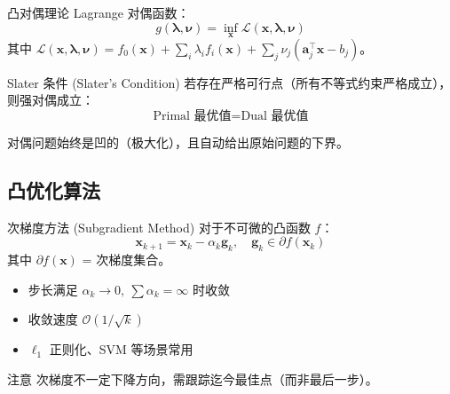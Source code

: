 \documentclass[11pt, aspectratio=169, svgnames, table, fontset=fandol]{ctexbeamer}
\begin{document}
\begin{frame}{凸对偶理论}
  Lagrange 对偶函数：
  \begin{equation*}
    g(\bm{\lambda}, \bm{\nu}) = \inf_{\bm{x}} \mathcal{L}(\bm{x}, \bm{\lambda}, \bm{\nu})
  \end{equation*}
  其中 $\mathcal{L}(\bm{x}, \bm{\lambda}, \bm{\nu}) = f_0(\bm{x}) + \sum_i \lambda_i f_i(\bm{x}) + \sum_j \nu_j (\bm{a}_j^\top \bm{x} - b_j)$。

  \vspace{6pt}
  \begin{block}{Slater 条件 (Slater's Condition)}
    若存在严格可行点（所有不等式约束严格成立），则强对偶成立：
    \begin{equation*}
      \text{Primal 最优值} = \text{Dual 最优值}
    \end{equation*}
  \end{block}
  对偶问题始终是凹的（极大化），且自动给出原始问题的下界。
\end{frame}

\subsection{凸优化算法}

\begin{frame}{次梯度方法 (Subgradient Method)}
  对于不可微的凸函数 $f$：
  \begin{equation*}
    \bm{x}_{k+1} = \bm{x}_k - \alpha_k \bm{g}_k,\quad \bm{g}_k \in \partial f(\bm{x}_k)
  \end{equation*}
  其中 $\partial f(\bm{x})$ = 次梯度集合。

  \begin{itemize}
    \item 步长满足 $\alpha_k \to 0,\ \sum \alpha_k = \infty$ 时收敛
    \item 收敛速度 $\mathcal{O}(1/\sqrt{k})$
    \item $\ell_1$ 正则化、SVM 等场景常用
  \end{itemize}

  \vspace{6pt}
  \begin{alertblock}{注意}
    次梯度不一定下降方向，需跟踪迄今最佳点（而非最后一步）。
  \end{alertblock}
\end{frame}
\end{document}
